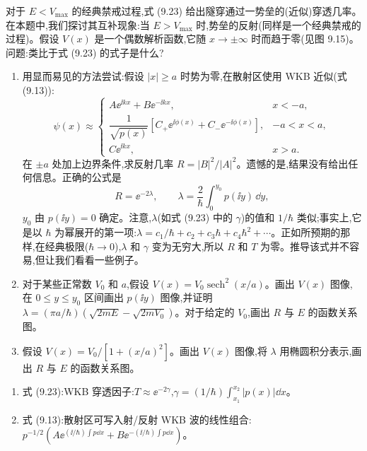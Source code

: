 \begin{question}
对于 $E<V_{\max}$ 的经典禁戒过程,式 (9.23) 给出隧穿通过一势垒的(近似)穿透几率。在本题中,我们探讨其互补现象:当 $E>V_{\max}$ 时,势垒的反射(同样是一个经典禁戒的过程)。假设 $V(x)$ 是一个偶数解析函数,它随 $x\to\pm\infty$ 时而趋于零(见图 9.15)。问题:类比于式 (9.23) 的式子是什么?
\begin{enumerate}
\item 用显而易见的方法尝试:假设 $|x|\ge a$ 时势为零,在散射区使用 WKB 近似(式 (9.13)):
\[
\psi(x)\approx\begin{cases}
A\ee^{\ii kx}+B\ee^{-\ii kx}, & x<-a,\\
\dfrac{1}{\sqrt{p(x)}}\left[C_+\ee^{\ii\phi(x)}+C_-\ee^{-\ii\phi(x)}\right], & -a<x<a,\\
C\ee^{\ii kx}, & x>a.
\end{cases}
\]
在 $\pm a$ 处加上边界条件,求反射几率 $R=|B|^2/|A|^2$。遗憾的是,结果没有给出任何信息。正确的公式是
\[
R=\ee^{-2\lambda},\qquad \lambda=\frac{2}{\hbar}\int_0^{y_0}p(\ii y)\,\dd y,
\]
$y_0$ 由 $p(\ii y)=0$ 确定。注意,$\lambda$(如式 (9.23) 中的 $\gamma$)的值和 $1/\hbar$ 类似;事实上,它是以 $\hbar$ 为幂展开的第一项:$\lambda=c_1/\hbar+c_2+c_3\hbar+c_4\hbar^2+\cdots$。正如所预期的那样,在经典极限($\hbar\to0$),$\lambda$ 和 $\gamma$ 变为无穷大,所以 $R$ 和 $T$ 为零。推导该式并不容易,但让我们看看一些例子。
\item 对于某些正常数 $V_0$ 和 $a$,假设 $V(x)=V_0\operatorname{sech}^2(x/a)$。画出 $V(x)$ 图像,在 $0\le y\le y_0$ 区间画出 $p(\ii y)$ 图像,并证明 $\lambda=(\pi a/\hbar)(\sqrt{2mE}-\sqrt{2mV_0})$。对于给定的 $V_0$,画出 $R$ 与 $E$ 的函数关系图。
\item 假设 $V(x)=V_0/[1+(x/a)^2]$。画出 $V(x)$ 图像,将 $\lambda$ 用椭圆积分表示,画出 $R$ 与 $E$ 的函数关系图。
\end{enumerate}

\par\smallskip
{}
\begin{enumerate}[leftmargin=2.2em,itemsep=0.12em,topsep=0.12em,parsep=0pt]
\item 式 (9.23):WKB 穿透因子:$T\approx \ee^{-2\gamma}$,$\gamma=(1/\hbar)\int_{x_1}^{x_2}|p(x)|\dd x$。
\item 式 (9.13):散射区可写入射/反射 WKB 波的线性组合:$p^{-1/2}(A\ee^{(\ii/\hbar)\int p\dd x}+B\ee^{-(\ii/\hbar)\int p\dd x})$。
\end{enumerate}

\end{question}
